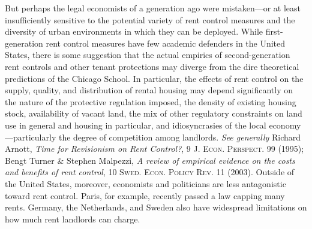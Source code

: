 But perhaps the legal economists of a generation ago were mistaken---or at least
insufficiently sensitive to the potential variety of rent control measures and
the diversity of urban environments in which they can be deployed. While
first-generation rent control measures have few academic defenders in the
United States, there is some suggestion that the actual empirics of
second-generation rent controls and other tenant protections may diverge from
the dire theoretical predictions of the Chicago School. In particular, the
effects of rent control on the supply, quality, and distribution of rental
housing may depend significantly on the nature of the protective regulation
imposed, the density of existing housing stock, availability of vacant land,
the mix of other regulatory constraints on land use in general and housing in
particular, and idiosyncrasies of the local economy---particularly the degree
of competition among landlords. \textit{See generally} Richard Arnott,
\textit{Time for Revisionism on Rent Control?}, 9 \textsc{J. Econ. Perspect.}
99 (1995); Bengt Turner \& Stephen Malpezzi, \textit{A review of empirical
evidence on the costs and benefits of rent control}, 10 \textsc{Swed. Econ.
Policy Rev}. 11 (2003). Outside of the United States, moreover, economists and
politicians are less antagonistic toward rent control.  Paris, for example,
recently passed a law capping many rents.  Germany, the Netherlands, and Sweden
also have widespread limitations on how much rent landlords can charge.  

